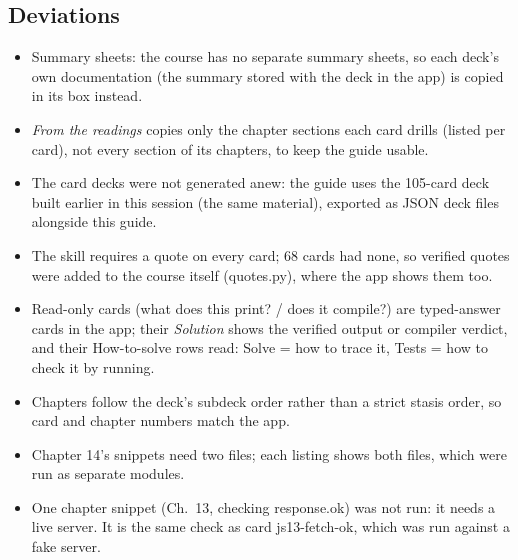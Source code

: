\documentclass[10pt]{article}
\newcommand{\code}[1]{{\ttfamily\small #1}}
\begin{document}
\subsection*{Deviations}
{\footnotesize\begin{itemize}
\item Summary sheets: the course has no separate summary sheets, so each deck's own documentation (the summary stored with the deck in the app) is copied in its box instead.
\item \emph{From the readings} copies only the chapter sections each card drills (listed per card), not every section of its chapters, to keep the guide usable.
\item The card decks were not generated anew: the guide uses the 105-card deck built earlier in this session (the same material), exported as JSON deck files alongside this guide.
\item The skill requires a quote on every card; 68 cards had none, so verified quotes were added to the course itself (\code{quotes.py}), where the app shows them too.
\item Read-only cards (what does this print? / does it compile?) are typed-answer cards in the app; their \emph{Solution} shows the verified output or compiler verdict, and their How-to-solve rows read: Solve = how to trace it, Tests = how to check it by running.
\item Chapters follow the deck's subdeck order rather than a strict stasis order, so card and chapter numbers match the app.
\item Chapter 14's snippets need two files; each listing shows both files, which were run as separate modules.
\item One chapter snippet (Ch.~13, checking response.ok) was not run: it needs a live server. It is the same check as card js13-fetch-ok, which was run against a fake server.
\end{itemize}}
\end{document}
